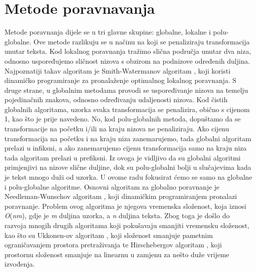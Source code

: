 \documentclass[times, utf8, zavrsni]{fer}
\begin{document}
\section{Metode poravnavanja}
Metode poravnanja dijele se u tri glavne skupine: globalne, lokalne i polu-globalne. Ove metode razlikuju se u načinu na koji se penaliziraju transformacija unutar teksta. Kod lokalnog poravnanja tražimo slična područja unutar dva niza, odnosno uspoređujemo sličnost nizova s obzirom na podnizove određenih duljina. Najpoznatiji takav algoritam je Smith-Watermanov algoritam \citep{Smith1981}, koji koristi dinamičko programiranje za pronalaženje optimalnog lokalnog poravnanja. S druge strane, u globalnim metodama provodi se uspoređivanje nizova na temelju pojedinačnih znakova, odnosno određivanju udaljenosti nizova. Kod čistih globalnih algoritama, uzorka svaka transformacija se penalizira, obično s cijenom 1, kao što je prije navedeno. No, kod polu-globalnih metoda, dopuštamo da se transformacije na početku i/ili na kraju nizova ne penaliziraju. Ako cijenu transformacija na početku i na kraju niza zanemarujemo, tada globalni algoritam prelazi u infiksni, a ako zanemarujemo cijenu transformacija samo na kraju niza tada algoritam prelazi u prefiksni. Iz ovoga je vidljivo da su globalni algoritmi primjenjivi na nizove slične duljine, dok su polu-globalni bolji u slučajevima kada je tekst mnogo duži od uzorka. U ovome radu fokusirat ćemo se samo na globalne i polu-globalne algoritme. Osnovni algoritam za globalno poravnanje je Needleman-Wunschov algoritam \citep{Needleman1970}, koji dinamičkim programiranjem pronalazi poravnanje. Problem ovog algoritma je njegova vremenska složenost, koja iznosi \textit{O}(\textit{nm}), gdje je \textit{m} duljina uzorka, a \textit{n} duljina teksta. Zbog toga je došlo do razvoja mnogih drugih algoritama koji pokušavaju smanjiti vremensku složenost, kao što su Ukkonen-ov algoritam \citep{Ukkonen1985}, koji složenost smanjuje pametnim ograničavanjem prostora pretraživanja te Hirschebergov algoritam \citep{Hirschberg1975}, koji prostornu složenost smanjuje na linearnu u zamjenu za nešto duže vrijeme izvođenja.
\end{document}
